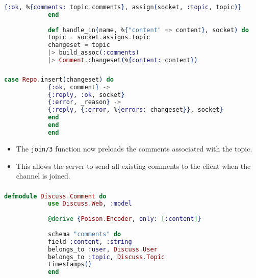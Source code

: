 \documentclass[aspectratio=169, table]{beamer}
\begin{document}
	\begin{frame}[fragile]
		\frametitle{}
		\begin{lstlisting}[language=Elixir]
			{:ok, %{comments: topic.comments}, assign(socket, :topic, topic)}
			end
			
			def handle_in(name, %{"content" => content}, socket) do
			topic = socket.assigns.topic
			changeset = topic
			|> build_assoc(:comments)
			|> Comment.changeset(%{content: content})
		\end{lstlisting}
	\end{frame}
	
	\begin{frame}[fragile]
		\frametitle{}
		\begin{lstlisting}[language=Elixir]
			case Repo.insert(changeset) do
			{:ok, comment} ->
			{:reply, :ok, socket}
			{:error, _reason} ->
			{:reply, {:error, %{errors: changeset}}, socket}
			end
			end
			end
		\end{lstlisting}
		\begin{itemize}
			\item The \texttt{join/3} function now preloads the comments associated with the topic.
			\item This allows the server to send all existing comments to the client when the channel is joined.
		\end{itemize}
	\end{frame}
	
	\begin{frame}[fragile]
		\frametitle{}
		\begin{lstlisting}[language=Elixir]
			defmodule Discuss.Comment do
			use Discuss.Web, :model
			
			@derive {Poison.Encoder, only: [:content]}
			
			schema "comments" do
			field :content, :string
			belongs_to :user, Discuss.User
			belongs_to :topic, Discuss.Topic
			timestamps()
			end
		\end{lstlisting}
	\end{frame}
	
\end{document}
